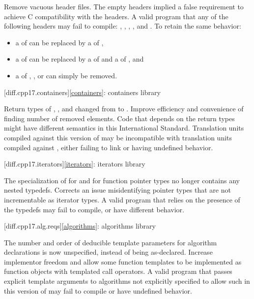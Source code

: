 \change
Remove vacuous \Cpp{} header files.
\rationale
The empty headers implied a false requirement to achieve C compatibility with the \Cpp{} headers.
\effect
A valid \CppXVII{} program that  any of the following headers may fail to compile:
,
,
,
, and
.
To retain the same behavior:
\begin{itemize}
\item
a  of  can be replaced by
a  of ,
\item
a  of  can be replaced by
a  of  and
a  of ,
and
\item
a  of
,
, or
can simply be removed.
\end{itemize}

[diff.cpp17.containers]{\ref{containers}: containers library}

\change
Return types of , , and 
changed from  to .
\rationale
Improve efficiency and convenience of finding number of removed elements.
\effect
Code that depends on the return types might have different semantics in this International Standard.
Translation units compiled against this version of \Cpp{} may be incompatible with
translation units compiled against \CppXVII{}, either failing to link or having undefined behavior.

[diff.cpp17.iterators]{\ref{iterators}: iterators library}

\change
The specialization of  for  and
for function pointer types no longer contains any nested typedefs.
\rationale
Corrects an issue misidentifying pointer types that are not incrementable
as iterator types.
\effect
A valid \CppXVII{} program that relies on the presence of the typedefs
may fail to compile, or have different behavior.

[diff.cpp17.alg.reqs]{\ref{algorithms}: algorithms library}

\change
The number and order of deducible template parameters for algorithm declarations
is now unspecified, instead of being as-declared.
\rationale
Increase implementor freedom and allow some function templates
to be implemented as function objects with templated call operators.
\effect
A valid \CppXVII{} program that passes explicit template arguments to
algorithms not explicitly specified to allow such in this version of \Cpp{}
may fail to compile or have undefined behavior.


